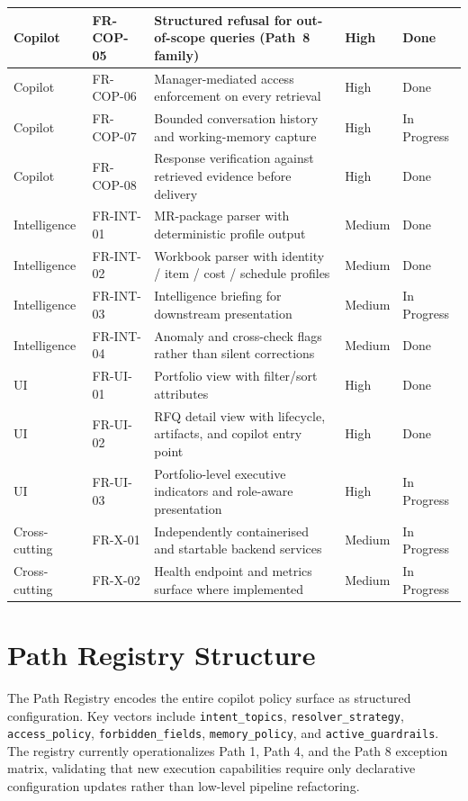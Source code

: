 \begin{longtable}{|p{1.2cm}|p{1.8cm}|p{6.6cm}|p{1.4cm}|p{1.6cm}|}
Copilot & FR-COP-05 & Structured refusal for out-of-scope queries (Path~8 family) & High & Done \\ \hline
Copilot & FR-COP-06 & Manager-mediated access enforcement on every retrieval & High & Done \\ \hline
Copilot & FR-COP-07 & Bounded conversation history and working-memory capture & High & In Progress \\ \hline
Copilot & FR-COP-08 & Response verification against retrieved evidence before delivery & High & Done \\ \hline
Intelligence & FR-INT-01 & MR-package parser with deterministic profile output & Medium & Done \\ \hline
Intelligence & FR-INT-02 & Workbook parser with identity / item / cost / schedule profiles & Medium & Done \\ \hline
Intelligence & FR-INT-03 & Intelligence briefing for downstream presentation & Medium & In Progress \\ \hline
Intelligence & FR-INT-04 & Anomaly and cross-check flags rather than silent corrections & Medium & Done \\ \hline
UI & FR-UI-01 & Portfolio view with filter/sort attributes & High & Done \\ \hline
UI & FR-UI-02 & RFQ detail view with lifecycle, artifacts, and copilot entry point & High & Done \\ \hline
UI & FR-UI-03 & Portfolio-level executive indicators and role-aware presentation & High & In Progress \\ \hline
Cross-cutting & FR-X-01 & Independently containerised and startable backend services & Medium & In Progress \\ \hline
Cross-cutting & FR-X-02 & Health endpoint and metrics surface where implemented & Medium & In Progress \\ \hline
\end{longtable}
\endgroup

\section{Path Registry Structure}
\label{app:path-registry}

The Path Registry encodes the entire copilot policy surface as structured configuration. Key vectors include \texttt{intent\_topics}, \texttt{resolver\_strategy}, \texttt{access\_policy}, \texttt{forbidden\_fields}, \texttt{memory\_policy}, and \texttt{active\_guardrails}. The registry currently operationalizes Path 1, Path 4, and the Path 8 exception matrix, validating that new execution capabilities require only declarative configuration updates rather than low-level pipeline refactoring.

